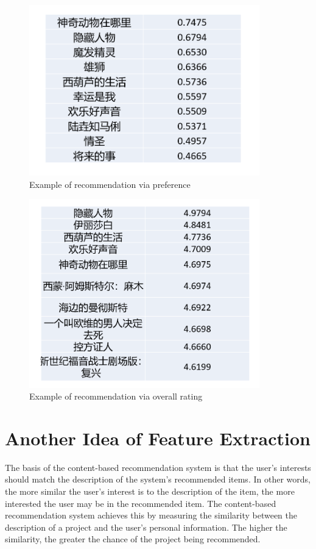 \documentclass[11pt,a4paper]{article}
\begin{document}
\begin{figure}[ht]
\centering
\includegraphics[width = 10cm]{8.png}
\caption{Example of recommendation via preference}
\label{}
\end{figure}

\begin{figure}[ht]
\centering
\includegraphics[width = 10cm]{9.png}
\caption{Example of recommendation via overall rating}
\label{}
\end{figure}


\hypertarget{header-n72}{%
\section{Another Idea of Feature Extraction}\label{header-n72}}

The basis of the content-based recommendation system is that the user's
interests should match the description of the system's recommended
items. In other words, the more similar the user's interest is to the
description of the item, the more interested the user may be in the
recommended item. The content-based recommendation system achieves this
by measuring the similarity between the description of a project and the
user's personal information. The higher the similarity, the greater the
chance of the project being recommended.
\end{document}
